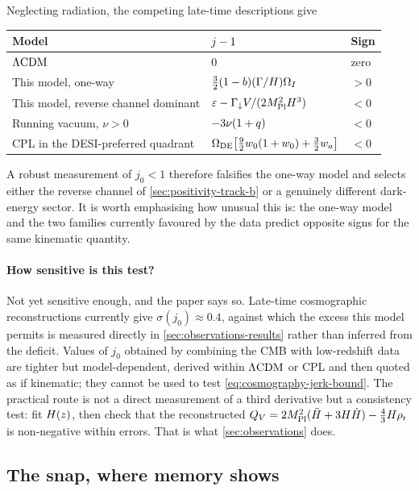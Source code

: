 \begin{theorem}\label{thm:sign-table}
  Neglecting radiation, the competing late-time descriptions give
  \begin{center}
  \begin{tabular}{lll}
    \toprule
    Model & $j-1$ & Sign \\
    \midrule
    $\Lambda\mathrm{CDM}$ & $0$ & zero \\
    This model, one-way & $\tfrac32(1-b)(\Gamma/H)\Omega_I$ & $>0$ \\
    This model, reverse channel dominant
      & $\varepsilon-\Gamma_{\downarrow} V/(2M_{\mathrm{Pl}}^2H^3)$ & $<0$ \\
    Running vacuum, $\nu>0$ & $-3\nu(1+q)$ & $<0$ \\
    CPL in the DESI-preferred quadrant
      & $\Omega_{\rm DE}\!\left[\tfrac92w_0(1+w_0)+\tfrac32w_a\right]$ & $<0$ \\
    \bottomrule
  \end{tabular}
  \end{center}
\end{theorem}

A robust measurement of $j_0<1$ therefore falsifies the one-way model and
selects either the reverse channel of \cref{sec:positivity-track-b} or a
genuinely different dark-energy sector. It is worth emphasising how unusual
this is: the one-way model and the two families currently favoured by the data
predict opposite signs for the same kinematic quantity.

\paragraph{How sensitive is this test?} Not yet sensitive enough, and the paper
says so. Late-time cosmographic reconstructions currently give
$\sigma(j_0)\approx0.4$, against which the excess this model permits is
measured directly in \cref{sec:observations-results} rather than inferred from
the deficit.
Values of $j_0$ obtained by combining the CMB with low-redshift data are
tighter but model-dependent, derived within $\Lambda\mathrm{CDM}$ or CPL and then quoted as
if kinematic; they cannot be used to test
\cref{eq:cosmography-jerk-bound}. The practical route is not a direct
measurement of a third derivative but a consistency test: fit $H(z)$, then
check that the reconstructed
$Q_{V}=2M_{\mathrm{Pl}}^2(\ddot {H}+3H\dot {H})-\tfrac43H\rho_{\mathrm{r}}$ is non-negative
within errors. That is what \cref{sec:observations} does.

\subsection{The snap, where memory shows}\label{sec:cosmography-snap}

